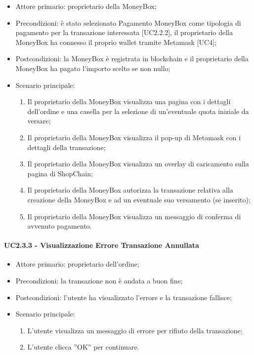 \begin{itemize}
    \item Attore primario: proprietario della MoneyBox\glo{};
    \item Precondizioni: è stato selezionato Pagamento MoneyBox\glo{} come tipologia di pagamento per la transazione interessata [UC2.2.2], 
            il proprietario della MoneyBox\glo{} ha connesso il proprio wallet\glo{} tramite Metamask\glo{} [UC4];
    \item Postcondizioni: la MoneyBox\glo{} è registrata in blockchain e il proprietario della MoneyBox\glo{} ha pagato l'importo scelto se non nullo;
    \item Scenario principale:
    \begin{enumerate}
        \item Il proprietario della MoneyBox\glo{} visualizza una pagina con i dettagli dell'ordine e una casella per la selezione di un'eventuale quota iniziale da versare;
        \item Il proprietario della MoneyBox\glo{} visualizza il pop-up di Metamask\glo{} con i dettagli della transazione;
        \item Il proprietario della MoneyBox\glo{} visualizza un overlay di caricamento sulla pagina di ShopChain;
        \item Il proprietario della MoneyBox\glo{} autorizza la transazione relativa alla creazione della MoneyBox\glo{} e ad un eventuale suo versamento (se inserito);
        \item Il proprietario della MoneyBox\glo{} visualizza un messaggio di conferma di avvenuto pagamento.
    \end{enumerate}
\end{itemize}

\paragraph{UC2.3.3 - Visualizzazione Errore Transazione Annullata}

\begin{itemize}
    \item Attore primario: proprietario dell'ordine;
    \item Precondizioni: la transazione non è andata a buon fine;
    \item Postcondizioni: l'utente ha visualizzato l'errore e la transazione fallisce;
    \item Scenario principale:
          \begin{enumerate}
              \item L'utente visualizza un messaggio di errore per rifiuto della transazione;
              \item L'utente clicca ”OK” per continuare.
          \end{enumerate}
\end{itemize}

